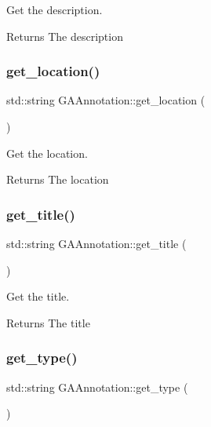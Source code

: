 Get the description. 

\begin{DoxyReturn}{Returns}
The description 
\end{DoxyReturn}
\mbox{\label{class_g_a_annotation_a4c309b06dcb5dec5445e281fe21f3fd2}} 
\subsubsection{\texorpdfstring{get\+\_\+location()}{get\_location()}}
{\footnotesize\ttfamily std\+::string G\+A\+Annotation\+::get\+\_\+location (\begin{DoxyParamCaption}{ }\end{DoxyParamCaption})}



Get the location. 

\begin{DoxyReturn}{Returns}
The location 
\end{DoxyReturn}
\mbox{\label{class_g_a_annotation_ace301a090121c29f554bc30ed5a58d53}} 
\subsubsection{\texorpdfstring{get\+\_\+title()}{get\_title()}}
{\footnotesize\ttfamily std\+::string G\+A\+Annotation\+::get\+\_\+title (\begin{DoxyParamCaption}{ }\end{DoxyParamCaption})}



Get the title. 

\begin{DoxyReturn}{Returns}
The title 
\end{DoxyReturn}
\mbox{\label{class_g_a_annotation_a6a5e4d1a8273090181ef60cbe06bf7c1}} 
\subsubsection{\texorpdfstring{get\+\_\+type()}{get\_type()}}
{\footnotesize\ttfamily std\+::string G\+A\+Annotation\+::get\+\_\+type (\begin{DoxyParamCaption}{ }\end{DoxyParamCaption})}



